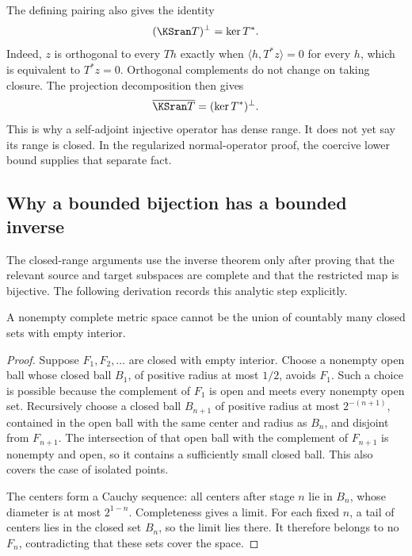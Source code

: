 \documentclass[11pt,oneside,openany]{book}
\numberwithin{equation}{section}
\begin{document}
The defining pairing also gives the identity
\begin{equation}\label{KS:eq:adjoint-range-orthogonal}
 (\KSran T)^\perp=\ker T^*.
\end{equation}
Indeed, \(z\) is orthogonal to every \(Th\) exactly when \(\langle h,T^*z\rangle=0\) for every \(h\), which is equivalent to \(T^*z=0\). Orthogonal complements do not change on taking closure. The projection decomposition then gives
\[
 \overline{\KSran T}=(\ker T^*)^\perp.
\]
This is why a self-adjoint injective operator has dense range. It does not yet say its range is closed. In the regularized normal-operator proof, the coercive lower bound supplies that separate fact.

\subsection{Why a bounded bijection has a bounded inverse}
The closed-range arguments use the inverse theorem only after proving that the relevant source and target subspaces are complete and that the restricted map is bijective. The following derivation records this analytic step explicitly.

\begin{KSlemma}\label{KS:lem:baire-tool}
A nonempty complete metric space cannot be the union of countably many closed sets with empty interior.
\end{KSlemma}
\begin{proof}
Suppose \(F_1,F_2,\ldots\) are closed with empty interior. Choose a nonempty open ball whose closed ball \(B_1\), of positive radius at most \(1/2\), avoids \(F_1\). Such a choice is possible because the complement of \(F_1\) is open and meets every nonempty open set. Recursively choose a closed ball \(B_{n+1}\) of positive radius at most \(2^{-(n+1)}\), contained in the open ball with the same center and radius as \(B_n\), and disjoint from \(F_{n+1}\). The intersection of that open ball with the complement of \(F_{n+1}\) is nonempty and open, so it contains a sufficiently small closed ball. This also covers the case of isolated points.

The centers form a Cauchy sequence: all centers after stage \(n\) lie in \(B_n\), whose diameter is at most \(2^{1-n}\). Completeness gives a limit. For each fixed \(n\), a tail of centers lies in the closed set \(B_n\), so the limit lies there. It therefore belongs to no \(F_n\), contradicting that these sets cover the space.
\end{proof}
\end{document}
